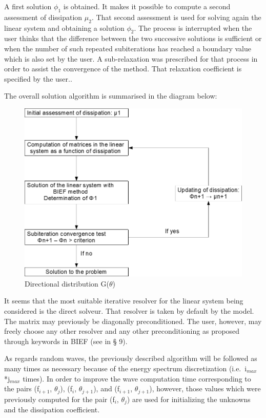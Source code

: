 A first solution $\phi_{1}$ is obtained. It makes it possible to compute a
second assessment of dissipation $\mu_{2}$. That second assessment is used for
solving again the linear system and obtaining a solution $\phi_{2}$. The
process is interrupted when the user thinks that the difference between the two
successive solutions is sufficient or when the number of such repeated
subiterations has reached a boundary value which is also set by the user. A
sub-relaxation was prescribed for that process in order to assist the
convergence of the method. That relaxation coefficient is specified by the
user..

The overall solution algorithm is summarised in the diagram below:

\begin{figure}[H]%
\begin{center}
%
  \includegraphics[width=\textwidth]{./graphics/dissipation}
%
\caption{Directional distribution G($\theta$)}\label{fig:dissipation}
\end{center}
\end{figure}

It seems that the most suitable iterative resolver for the linear system being
considered is the direct solveur. That resolver is taken by default by the
model. The matrix may previously be diagonally preconditioned. The user,
however, may freely choose any other resolver and any other preconditioning as
proposed through keywords in BIEF (see in {\S} 9).

As regards random waves, the previously described algorithm will be followed as
many times as necessary because of the energy spectrum discretization (i.e.\
i${}_{max}$*j${}_{max}$ times). In order to improve the wave computation time
corresponding to the pairs (f${}_{i+1}$, $\theta_{j}$), (f${}_{i}$,
$\theta_{j+1}$), and (f${}_{i+1}$, $\theta_{j+1}$), however, those values which
were previously computed for the pair (f${}_{i}$, $\theta_{j}$) are used for
initializing the unknowns and the dissipation coefficient.

